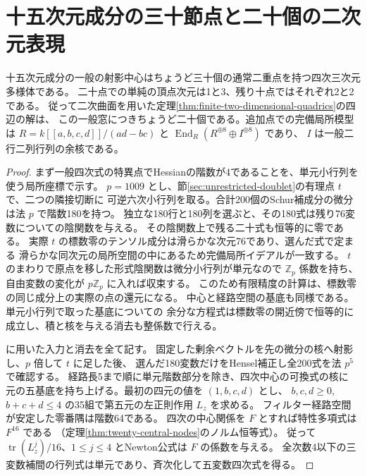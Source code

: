 \section{十五次元成分の三十節点と二十個の二次元表現}
\label{sec:thirty-central-nodes}
\begin{theorem}\label{thm:thirty-central-nodes}
十五次元成分の一般の射影中心はちょうど三十個の通常二重点を持つ四次三次元多様体である。
二十点での単純の頂点次元は1と3、残り十点ではそれぞれ2と2である。
従って二次曲面を用いた定理\ref{thm:finite-two-dimensional-quadrics}の四辺の解は、
この一般窓につきちょうど二十個である。追加点での完備局所模型は
$R=k[[a,b,c,d]]/(ad-bc)$ と
$\operatorname{End}_R(R^{\oplus8}\oplus I^{\oplus8})$ であり、
$I$ は一般二行二列行列の余核である。
\end{theorem}
\begin{proof}
まず一般四次式の特異点でHessianの階数が4であることを、単元小行列を使う局所座標で示す。
$p=1009$ とし、節\ref{sec:unrestricted-doublet}の有理点 $t$ で、二つの隣接切断に
可逆六次小行列を取る。合計200個のSchur補成分の微分は法 $p$ で階数180を持つ。
独立な180行と180列を選ぶと、その180式は残り76変数についての陰関数を与える。
その陰関数上で残る二十式も恒等的に零である。
実際 $t$ の標数零のテンソル成分は滑らかな次元76であり、選んだ式で定まる
滑らかな同次元の局所空間の中にあるため完備局所イデアルが一致する。
$t$ のまわりで原点を移した形式陰関数は微分小行列が単元なので
$\mathbb Z_p$ 係数を持ち、自由変数の変化が $p\mathbb Z_p$ に入れば収束する。
このため有限精度の計算は、標数零の同じ成分上の実際の点の還元になる。
中心と経路空間の基底も同様である。単元小行列で取った基底についての
余分な方程式は標数零の開近傍で恒等的に成立し、積と核を与える消去も整係数で行える。

 に用いた入力と消去を全て記す。
固定した剰余ベクトルを先の微分の核へ射影し、$p$ 倍して $t$ に足した後、
選んだ180変数だけをHensel補正し全200式を法 $p^5$ で確認する。
経路長5まで順に単元階数部分を除き、四次中心の可換式の核に
元の五基底を持ち上げる。最初の四元の値を $(1,b,c,d)$ とし、
$b,c,d\ge0$, $b+c+d\le4$ の35組で第五元の左正則作用 $L_z$ を求める。
フィルター経路空間が安定した零番隅は階数64である。
四次の中心関係を $F$ とすれば特性多項式は $F^{16}$ である
（定理\ref{thm:twenty-central-nodes}のノルム恒等式）。
従って $\operatorname{tr}(L_z^j)/16$、$1\le j\le4$ とNewton公式は $F$ の係数を与える。
全次数4以下の三変数補間の行列式は単元であり、斉次化して五変数四次式を得る。


\end{proof}
